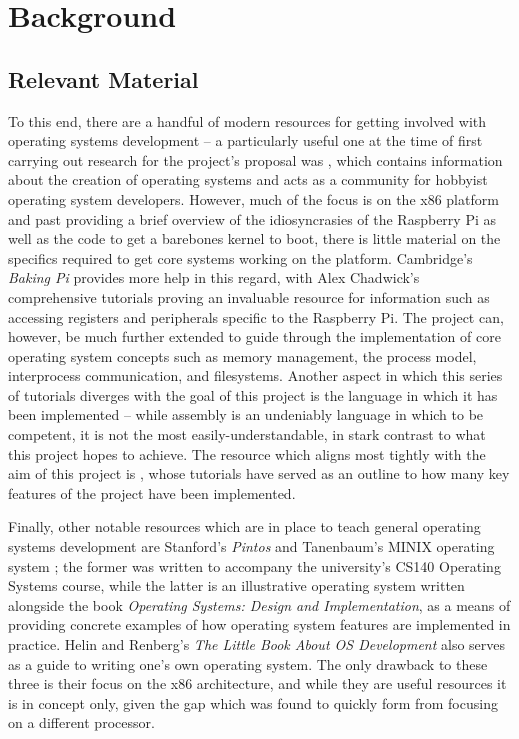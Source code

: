 \section{Background}
\subsection{Relevant Material}
    To this end, there are a handful of modern resources for getting involved
    with operating systems development -- a particularly useful one at the time
    of first carrying out research for the project's proposal was
    , which contains information about the creation of
    operating systems and acts as a community for hobbyist operating system
    developers. However, much of the focus is on the x86 platform and past
    providing a brief overview of the idiosyncrasies of the Raspberry Pi as well
    as the code to get a barebones kernel to boot, there is little material on
    the specifics required to get core systems working on the platform.
    Cambridge's \textit{Baking Pi} \cite{BakingPi} provides more help in this
    regard, with Alex Chadwick's comprehensive tutorials proving an invaluable
    resource for information such as accessing registers and peripherals
    specific to the Raspberry Pi. The project can, however, be much further
    extended to guide through the implementation of core operating system
    concepts such as memory management, the process model, interprocess
    communication, and filesystems. Another aspect in which this series of
    tutorials diverges with the goal of this project is the language in which it
    has been implemented -- while assembly is an undeniably language in which to
    be competent, it is not the most easily-understandable, in stark contrast to
    what this project hopes to achieve. The resource which aligns most tightly
    with the aim of this project is \cite{jsandler}, whose tutorials have served
    as an outline to how many key features of the project have been implemented.
    
    Finally, other notable resources which are in place to teach general
    operating systems development are Stanford's \textit{Pintos} \cite{Pintos}
    and Tanenbaum's MINIX operating system \cite{MINIX}; the former was written
    to accompany the university's CS140 Operating Systems course, while the
    latter is an illustrative operating system written alongside the book
    \textit{Operating Systems: Design and Implementation}, as a means of
    providing concrete examples of how operating system features are implemented
    in practice. Helin and Renberg's \textit{The Little Book About OS
    Development} \cite{littleosbook} also serves as a guide to writing one's own
    operating system. The only drawback to these three is their focus on the x86
    architecture, and while they are useful resources it is in concept only,
    given the gap which was found to quickly form from focusing on a different
    processor.

